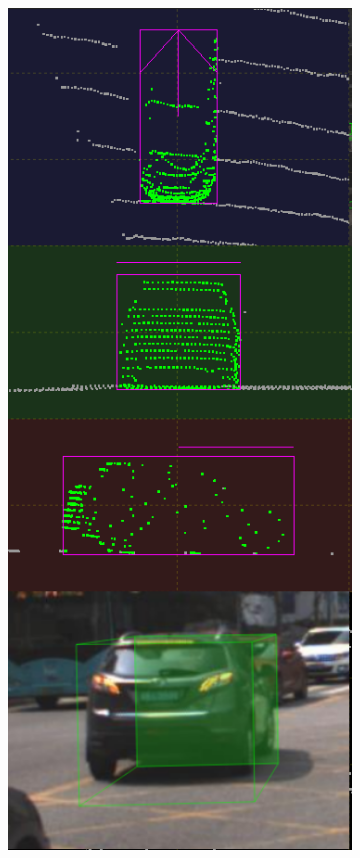 \documentclass[letterpaper, 10 pt, conference]{ieeeconf}  %
\begin{document}
\begin{figure}[th]
\begin{subfigure}{0.16\linewidth}
		\includegraphics[scale=0.12]{./figures/transfer/car-5}
		\caption{}
	\end{subfigure}
	

\end{figure}
\end{document}
